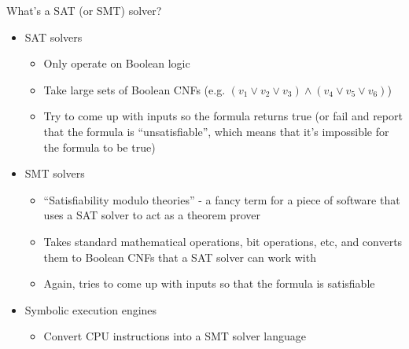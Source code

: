 \begin{frame}{What's a SAT (or SMT) solver?}
    \begin{itemize}
        \item<1-> SAT solvers
        \begin{itemize}
            \item<2-> Only operate on Boolean logic
            \item<3-> Take large sets of Boolean CNFs (e.g.
                  $(v_1 \lor v_2 \lor v_3) \land (v_4 \lor v_5 \lor v_6)$)
            \item<4-> Try to come up with inputs so the formula returns true
                  (or fail and report that the formula is ``unsatisfiable'',
                  which means that it's impossible for the formula to be true)
        \end{itemize}

        \item<5-> SMT solvers
        \begin{itemize}
            \item<6-> ``Satisfiability modulo theories'' - a fancy term for a
                      piece of software that uses a SAT solver to act as a
                      theorem prover
            \item<7-> Takes standard mathematical operations, bit operations,
                      etc, and converts them to Boolean CNFs that a SAT solver
                      can work with
            \item<8-> Again, tries to come up with inputs so that the formula
                      is satisfiable
        \end{itemize}

        \item<9-> Symbolic execution engines
        \begin{itemize}
            \item<10-> Convert CPU instructions into a SMT solver language
        \end{itemize}
    \end{itemize}
\end{frame}

